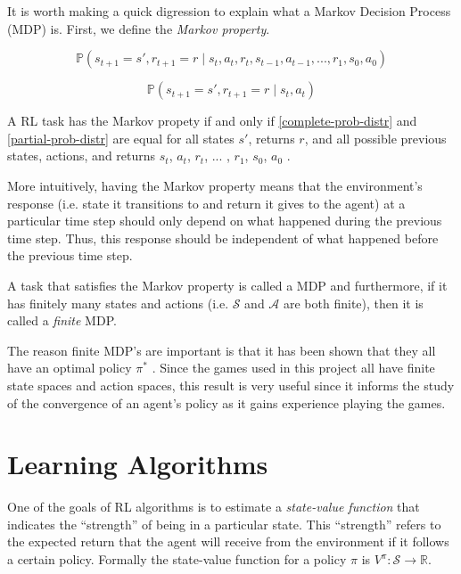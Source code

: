 \documentclass[11pt,a4paper]{report}
\begin{document}
It is worth making a quick digression to explain what a Markov Decision Process (MDP) is. First, we define the \emph{Markov property}.

\begin{equation}
	\mathbb{P}(s_{t+1} = s', r_{t+1} = r \mid s_t, a_t, r_t, s_{t-1}, a_{t-1}, ... , r_1, s_0, a_0)
 \label{complete-prob-distr}
\end{equation}

\begin{equation}
	\mathbb{P}(s_{t+1} = s', r_{t+1} = r \mid s_t, a_t) \label{partial-prob-distr}
\end{equation}

A RL task has the Markov propety if and only if \ref{complete-prob-distr} and \ref{partial-prob-distr} are equal for all states $s'$, returns $r$, and all possible previous states, actions, and returns $s_t$, $a_t$, $r_t$, ... , $r_1$, $s_0$, $a_0$ \cite{rl-book}.

More intuitively, having the Markov property means that the environment's response (i.e. state it transitions to and return it gives to the agent) at a particular time step should only depend on what happened during the previous time step. Thus, this response should be independent of what happened before the previous time step.

A task that satisfies the Markov property is called a MDP and furthermore, if it has finitely many states and actions (i.e. $\mathcal{S}$ and $\mathcal{A}$ are both finite), then it is called a \emph{finite} MDP. 

The reason finite MDP's are important is that it has been shown that they all have an optimal policy $\pi^{\ast}$ \cite{rl-book} \cite{mdp-convergence}. Since the games used in this project all have finite state spaces and action spaces, this result is very useful since it informs the study of the convergence of an agent's policy as it gains experience playing the games.


\section{Learning Algorithms}
\label{sec:learning-algorithms}

One of the goals of RL algorithms is to estimate a \emph{state-value function} that indicates the ``strength'' of being in a particular state. This ``strength'' refers to the expected return that the agent will receive from the environment if it follows a certain policy. Formally the state-value function for a policy $\pi$ is $V^{\pi} : \mathcal{S} \rightarrow \mathbb{R}$.
\end{document}
